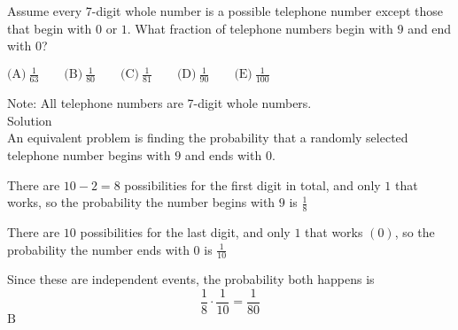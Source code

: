 

Assume every 7-digit whole number is a possible telephone number except those that begin with $0$ or $1$. What fraction of telephone numbers begin with $9$ and end with $0$?

$\text{(A)}\ \frac{1}{63} \qquad \text{(B)}\ \frac{1}{80} \qquad \text{(C)}\ \frac{1}{81} \qquad \text{(D)}\ \frac{1}{90} \qquad \text{(E)}\ \frac{1}{100}$

Note: All telephone numbers are 7-digit whole numbers.
\\
Solution
\\
An equivalent problem is finding the probability that a randomly selected telephone number begins with $9$ and ends with $0$.

There are $10-2=8$ possibilities for the first digit in total, and only $1$ that works, so the probability the number begins with $9$ is $\frac{1}{8}$

There are $10$ possibilities for the last digit, and only $1$ that works $(0)$, so the probability the number ends with $0$ is $\frac{1}{10}$

Since these are independent events, the probability both happens is \[\frac{1}{8}\cdot \frac{1}{10}=\frac{1}{80}\]
$\boxed{\text{B}}$
